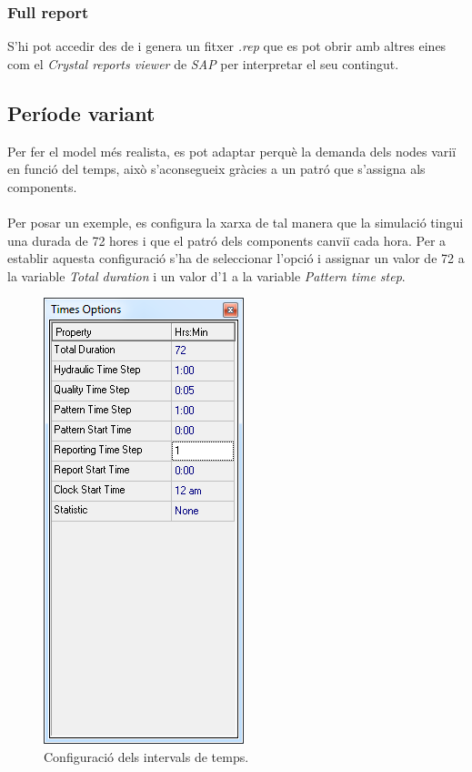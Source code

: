 \documentclass[12pt]{article}
\begin{document}
\pagebreak
\subsubsection{Full report}
S'hi pot accedir des de  i genera un fitxer \textit{.rep} que es pot obrir amb altres eines com el \textit{Crystal reports viewer}\cite{crystalReports} de \textit{SAP} per interpretar el seu contingut.


\pagebreak
\subsection{Període variant}
Per fer el model més realista, es pot adaptar perquè la demanda dels nodes variï en funció del temps, això s'aconsegueix gràcies a un patró que s'assigna als components. 
\\\\Per posar un exemple, es configura la xarxa de tal manera que la simulació tingui una durada de 72 hores i que el patró dels components canviï cada hora. Per a establir aquesta configuració s'ha de seleccionar l'opció  i assignar un valor de 72 a la variable \textit{Total duration} i un valor d'1 a la variable \textit{Pattern time step}.
\begin{figure}[h!]
	\centering
	\includegraphics[scale=.7]{imatges/epanet/15.png}
	\caption{Configuració dels intervals de temps.}
\end{figure}
\end{document}
